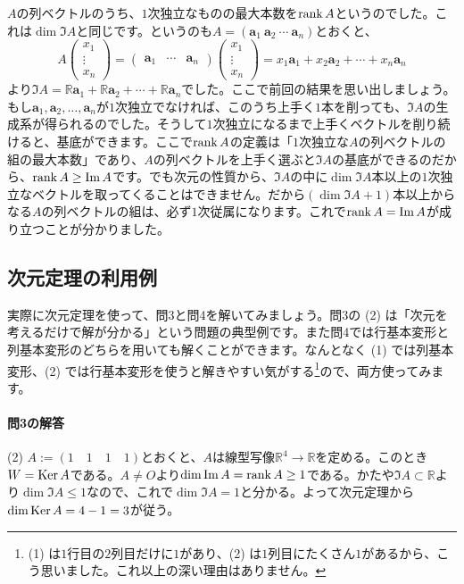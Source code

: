 $A$の列ベクトルのうち、$1$次独立なものの最大本数を$\operatorname{rank} A$というのでした。これは$\dim \Im A$と同じです。というのも$A = (\bm{a}_1\ \bm{a}_2\ \cdots\ \bm{a}_n)$とおくと、
\[
A
\begin{pmatrix}
x_1 \\
\vdots \\
x_n
\end{pmatrix}
= 
\begin{pmatrix}
\bm{a}_1 & \cdots & \bm{a}_n
\end{pmatrix}
\begin{pmatrix}
x_1 \\
\vdots \\
x_n
\end{pmatrix}
= x_1 \bm{a}_1 + x_2 \bm{a}_2 + \cdots + x_n \bm{a}_n
\]
より$\Im A = \mathbb{R}\bm{a}_1 + \mathbb{R}\bm{a}_2 + \cdots + \mathbb{R}\bm{a}_n$でした。ここで前回の結果を思い出しましょう。もし$\bm{a}_1, \bm{a}_2, \ldots, \bm{a}_n$が$1$次独立でなければ、このうち上手く$1$本を削っても、$\Im A$の生成系が得られるのでした。そうして$1$次独立になるまで上手くベクトルを削り続けると、基底ができます。ここで$\operatorname{rank} A$の定義は「$1$次独立な$A$の列ベクトルの組の最大本数」であり、$A$の列ベクトルを上手く選ぶと$\Im A$の基底ができるのだから、$\operatorname{rank} A \geq \mathrm{Im}\, A$です。でも次元の性質から、$\Im A$の中に$\dim \Im A$本以上の$1$次独立なベクトルを取ってくることはできません。だから$(\dim \Im A + 1)$本以上からなる$A$の列ベクトルの組は、必ず$1$次従属になります。これで$\operatorname{rank} A = \mathrm{Im}\, A$が成り立つことが分かりました。

\subsection{次元定理の利用例}

実際に次元定理を使って、問3と問4を解いてみましょう。問3の (2) は「次元を考えるだけで解が分かる」という問題の典型例です。また問4では行基本変形と列基本変形のどちらを用いても解くことができます。なんとなく (1) では列基本変形、(2) では行基本変形を使うと解きやすい気がする\footnote{(1) は$1$行目の$2$列目だけに$1$があり、(2) は$1$列目にたくさん$1$があるから、こう思いました。これ以上の深い理由はありません。}ので、両方使ってみます。

\paragraph{問3の解答}
\noindent (2) $A := (1 \quad 1 \quad 1 \quad 1)$とおくと、$A$は線型写像$\mathbb{R}^4\rightarrow\mathbb{R}$を定める。このとき$W = \operatorname{Ker} A$である。$A \neq O$より$\dim \mathrm{Im}\, A = \operatorname{rank} A \geq 1$である。かたや$\Im A \subset\mathbb{R}$より$\dim \Im A \leq 1$なので、これで$\dim \Im A = 1$と分かる。よって次元定理から$\dim \operatorname{Ker} A = 4 - 1 = 3$が従う。


